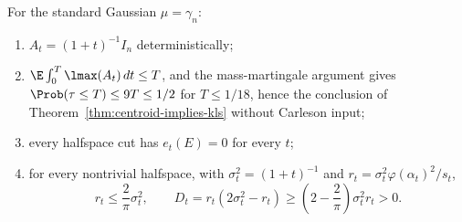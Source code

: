 \documentclass[../main.tex]{subfiles}
\begin{document}
\begin{proposition}[= Proposition~\ref{prop:gaussian-model}]
\label{prop:sol-gaussian-model}
For the standard Gaussian $\mu=\gamma_n$:
\begin{enumerate}[label=(\roman*),leftmargin=2.2em]
  \item $A_t=(1+t)^{-1}I_n$ deterministically;
  \item $\E\int_0^T\lmax(A_t)\,dt\le T$, and the mass-martingale argument gives
        $\Prob(\tau\le T)\le9T\le1/2$ for $T\le1/18$, hence the conclusion of
        Theorem~\ref{thm:centroid-implies-kls} without Carleson input;
  \item every halfspace cut has $e_t(E)=0$ for every $t$;
  \item for every nontrivial halfspace, with $\sigma_t^2=(1+t)^{-1}$ and
        $r_t=\sigma_t^2\varphi(\alpha_t)^2/s_t$,
        \[
          r_t\le\frac2\pi\sigma_t^2,
          \qquad
          D_t=r_t(2\sigma_t^2-r_t)
          \ge\left(2-\frac2\pi\right)\sigma_t^2r_t>0.
        \]
\end{enumerate}
\end{proposition}
\end{document}
